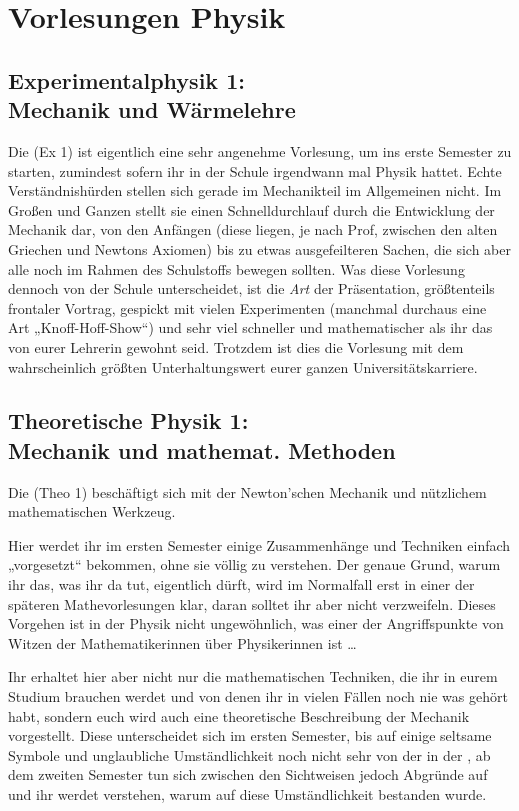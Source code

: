 \section*{Vorlesungen Physik}


\subsection{Experimentalphysik 1: \\Mechanik und Wärmelehre}
\label{ex1}
Die  (\gls{Ex} 1) ist eigentlich eine sehr angenehme Vorlesung, um ins erste Semester zu starten, zumindest sofern ihr in der Schule irgendwann mal Physik hattet. Echte Verständnishürden stellen sich gerade im Mechanikteil im Allgemeinen nicht. Im Großen und Ganzen stellt sie einen Schnelldurchlauf durch die Entwicklung der Mechanik dar, von den Anfängen (diese liegen, je nach Prof, zwischen den alten Griechen und Newtons Axiomen) bis zu etwas ausgefeilteren Sachen, die sich aber alle noch im Rahmen des Schulstoffs bewegen sollten. Was diese Vorlesung dennoch von der Schule unterscheidet, ist die \emph{Art} der Präsentation, größtenteils frontaler Vortrag, gespickt mit vielen Experimenten (manchmal durchaus eine Art „Knoff-Hoff-Show“) und sehr viel schneller und mathematischer als ihr das von eurer Lehrerin gewohnt seid. Trotzdem ist dies die Vorlesung mit dem wahrscheinlich größten Unterhaltungswert eurer ganzen Universitätskarriere.



\subsection{Theoretische Physik 1: \\Mechanik und mathemat. Methoden}
\label{theo1}
Die  (\gls{Theo} 1) beschäftigt sich mit der Newton'schen Mechanik und nützlichem mathematischen Werkzeug.

Hier werdet ihr im ersten Semester einige Zusammenhänge und Techniken einfach „vorgesetzt“ bekommen, ohne sie völlig zu verstehen. Der genaue Grund, warum ihr das, was ihr da tut, eigentlich dürft, wird im Normalfall erst in einer der späteren Mathevorlesungen klar, daran solltet ihr aber nicht verzweifeln. Dieses Vorgehen ist in der Physik nicht ungewöhnlich, was einer der Angriffspunkte von Witzen der Mathematikerinnen über Physikerinnen ist \dots

Ihr erhaltet hier aber nicht nur die mathematischen Techniken, die ihr in eurem Studium brauchen werdet und von denen ihr in vielen Fällen noch nie was gehört habt, sondern euch wird auch eine theoretische Beschreibung der Mechanik vorgestellt. Diese unterscheidet sich im ersten Semester, bis auf einige seltsame Symbole und unglaubliche Umständlichkeit noch nicht sehr von der in der , ab dem zweiten Semester tun sich zwischen den Sichtweisen jedoch Abgründe auf und ihr werdet verstehen, warum auf diese Umständlichkeit bestanden wurde.

